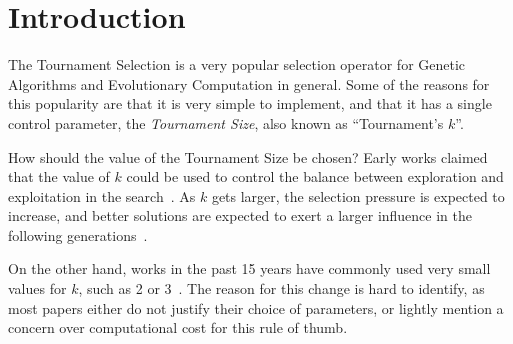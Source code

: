 \section{Introduction}\label{intro}


The Tournament Selection is a very popular selection operator for
Genetic Algorithms and Evolutionary Computation in general. Some of
the reasons for this popularity are that it is very simple to
implement, and that it has a single control parameter, the
\emph{Tournament Size}, also known as ``Tournament's $k$''.

How should the value of the Tournament Size be chosen? Early works
claimed that the value of $k$ could be used to control the balance
between exploration and exploitation in the
search~\cite{blickle1995mathematical}. As $k$ gets larger, the
selection pressure is expected to increase, and better solutions are
expected to exert a larger influence in the following
generations~\cite{miller1995genetic}.

On the other hand, works in the past 15 years have commonly used very
small values for $k$, such as 2 or
3~\cite{deb2000efficient,beyer2001self,
  kaelo2007integrated,nicolau2009application,
  sawyerr2011comparative,sawyerr2015benchmarking, oztekin2018decision}. The reason for this
change is hard to identify, as most papers either do not justify their
choice of parameters, or lightly mention a concern over computational
cost for this rule of thumb.


